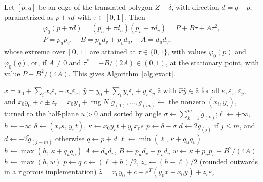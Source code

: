 \documentclass[10pt]{article}
\theoremstyle{definition}
\newcommand{\eps}{\varepsilon}
\newcommand{\ex}{\eps_x}
\newcommand{\ey}{\eps_y}
\newcommand{\rng}{\operatorname{rng}}
\providecommand{\DIFadd}[1]{\highLight[hlgray]{#1}} %
\providecommand{\DIFdel}[1]{{\protect\color{red}\strikeThrough{#1}}} %
\providecommand{\DIFaddbegin}{} %
\providecommand{\DIFaddend}{} %
\providecommand{\DIFdelbegin}{} %
\providecommand{\DIFdelend}{} %
\newcommand{\DIFscaledelfig}{0.5}
\newlength{\DIFdelgraphicswidth} %
\newlength{\DIFdelgraphicsheight} %
\newcommand{\DIFaddincludegraphics}[2][]{{\color{blue}\fbox{\DIFOincludegraphics[#1]{#2}}}} %
\newcommand{\DIFdelincludegraphics}[2][]{%
\sbox{\DIFdelgraphicsbox}{\DIFOincludegraphics[#1]{#2}}%
\settoboxwidth{\DIFdelgraphicswidth}{\DIFdelgraphicsbox} %
\settoboxtotalheight{\DIFdelgraphicsheight}{\DIFdelgraphicsbox} %
\scalebox{\DIFscaledelfig}{%
\parbox[b]{\DIFdelgraphicswidth}{\usebox{\DIFdelgraphicsbox}\\[-\baselineskip] \rule{\DIFdelgraphicswidth}{0em}}\llap{\resizebox{\DIFdelgraphicswidth}{\DIFdelgraphicsheight}{%
\setlength{\unitlength}{\DIFdelgraphicswidth}%
\begin{picture}(1,1)%
\thicklines\linethickness{2pt} %
{\color[rgb]{1,0,0}\put(0,0){\framebox(1,1){}}}%
{\color[rgb]{1,0,0}\put(0,0){\line( 1,1){1}}}%
{\color[rgb]{1,0,0}\put(0,1){\line(1,-1){1}}}%
\end{picture}%
}\hspace*{3pt}}} %
} %
\DeclareRobustCommand{\DIFaddbegin}{\DIFOaddbegin \let\includegraphics\DIFaddincludegraphics} %
\DeclareRobustCommand{\DIFaddend}{\DIFOaddend \let\includegraphics\DIFOincludegraphics} %
\DeclareRobustCommand{\DIFdelbegin}{\DIFOdelbegin \let\includegraphics\DIFdelincludegraphics} %
\DeclareRobustCommand{\DIFdelend}{\DIFOaddend \let\includegraphics\DIFOincludegraphics} %
\begin{document}
Let $[p,q]$ be an edge of the translated polygon $Z+\delta$, with direction $d=q-p$, parametrized as $p+\tau d$ with $\tau\in[0,1]$. Then
\[
\begin{gathered}\varphi_0(p+\tau d)=(p_u+\tau d_u)(p_v+\tau d_v)=P+B\tau+A\tau^2,\\ P=p_up_v,\quad B=p_ud_v+p_vd_u,\quad A=d_ud_v,\end{gathered}
\]
whose extrema over $[0,1]$ are attained at $\tau\in\{0,1\}$, with values $\varphi_0(p)$ and $\varphi_0(q)$, or, if $A\ne0$ and $\tau^*=-B/(2A)\in(0,1)$, at the stationary point, with value $P-B^2/(4A)$. This gives Algorithm~\ref{alg:exact}.

\begin{algorithm}[H]
\caption{Exact multiplication of reduced affine forms}
\label{alg:exact}
\begin{algorithmic}[1]
\Require $\hat x = x_0+\sum_ix_i\eps_i+x_r\ex$, $\hat y = y_0+\sum_iy_i\eps_i+y_r\ey$
\Ensure $\hat z$ with $\hat x\hat y\in\hat z$ for all $e,\ex,\ey$, and $x_0y_0+c\pm z_r = x_0y_0+\rng N$
\State $\tilde g_{(1)},\dots,\tilde g_{(m)}\gets$ the nonzero $(x_i,y_i)$, turned to the half-plane $u>0$ and sorted by angle
\State $\sigma\gets\sum_{k=1}^m\tilde g_{(k)}$;\quad $\ell\gets+\infty$, $h\gets-\infty$
  \State $\delta\gets(x_rs,\,y_rt)$, $\kappa\gets x_0y_rt+y_0x_rs$
  \State $p\gets\delta-\sigma$ 
    \State $d\gets2\tilde g_{(j)}$ if $j\le m$, and $d\gets-2\tilde g_{(j-m)}$ otherwise
    \State $q\gets p+d$
    \DIFdelbegin \DIFdel{; }\DIFdelend \DIFaddbegin \State \DIFaddend $\ell\gets\min(\ell,\,\kappa+q_uq_v)$
    \DIFdelbegin \DIFdel{, }\DIFdelend \DIFaddbegin \State \DIFaddend $h\gets\max(h,\,\kappa+q_uq_v)$
    \State $A\gets d_ud_v$, $B\gets p_ud_v+p_vd_u$
      \State $w\gets\kappa+p_up_v-B^2/(4A)$
      \DIFdelbegin \DIFdel{; $\ell\gets\min(\ell,w)$, }\DIFdelend \DIFaddbegin {} 
        \State \DIFaddend $h\gets\max(h,w)$
      \DIFaddbegin \Else {}
        \State \DIFadd{$\ell\gets\min(\ell,w)$
      }\EndIf
    \DIFaddend \EndIf
    \State $p\gets q$
  \EndFor
\EndFor
\State $c\gets(\ell+h)/2$, $z_r\gets(h-\ell)/2$ (rounded outwards in a rigorous implementation)
\State \Return $\hat z = x_0y_0+c+e^T(y_0x+x_0y)+z_r\eps_z$
\end{algorithmic}
\end{algorithm}
\end{document}
